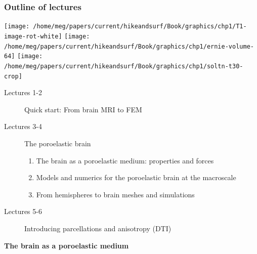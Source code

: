 \documentclass[10pt, mathserif, aspectratio=169, t]{beamer}
\newcommand{\mysection}[1]{\begin{frame} \begin{center} \vspace{3em} \textbf{#1} \end{center} \end{frame}}
\begin{document}
\begin{frame}
  \frametitle{Outline of lectures}
  \begin{center}
  \texttt{[image: /home/meg/papers/current/hikeandsurf/Book/graphics/chp1/T1-image-rot-white]}
  \texttt{[image: /home/meg/papers/current/hikeandsurf/Book/graphics/chp1/ernie-volume-64]}
  \texttt{[image: /home/meg/papers/current/hikeandsurf/Book/graphics/chp1/soltn-t30-crop]}
  \end{center}
  \begin{description}
    \item[Lectures 1-2] Quick start: From brain MRI to FEM
    \item[Lectures 3-4] The poroelastic brain  
      \begin{enumerate}[I]
      \item
        The brain as a poroelastic medium: properties and forces
      \item
        Models and numerics for the poroelastic brain at the macroscale
      \item
        From hemispheres to brain meshes and simulations
      \end{enumerate}
    \item[Lectures 5-6] Introducing parcellations and anisotropy (DTI)
  \end{description}
\end{frame}

\graphicspath{{/home/meg/presentations/slidesx/}}

\mysection{The brain as a poroelastic medium}











\end{document}
